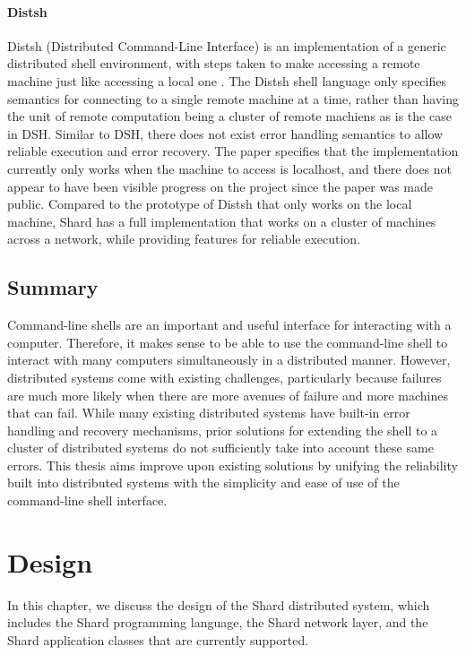 \documentclass[oneside]{report}
\begin{document}
\subsubsection{Distsh}
Distsh (Distributed Command-Line Interface) is an implementation of a generic distributed shell environment, with steps taken to make accessing a remote machine just like accessing a local one \cite{distsh}.
The Distsh shell language only specifies semantics for connecting to a single remote machine at a time, rather than having the unit of remote computation being a cluster of remote machiens as is the case in DSH.
Similar to DSH, there does not exist error handling semantics to allow reliable execution and error recovery.
The paper specifies that the implementation currently only works when the machine to access is localhost, and there does not appear to have been visible progress on the project since the paper was made public.
Compared to the prototype of Distsh that only works on the local machine, Shard has a full implementation that works on a cluster of machines across a network, while providing features for reliable execution.

\section{Summary}
Command-line shells are an important and useful interface for interacting with a computer.
Therefore, it makes sense to be able to use the command-line shell to interact with many computers simultaneously in a distributed manner.
However, distributed systems come with existing challenges, particularly because failures are much more likely when there are more avenues of failure and more machines that can fail.
While many existing distributed systems have built-in error handling and recovery mechanisms, prior solutions for extending the shell to a cluster of distributed systems do not sufficiently take into account these same errors.
This thesis aims improve upon existing solutions by unifying the reliability built into distributed systems with the simplicity and ease of use of the command-line shell interface.

\chapter{Design}

In this chapter, we discuss the design of the Shard distributed system, which includes the Shard programming language, the Shard network layer, and the Shard application classes that are currently supported.
\end{document}
